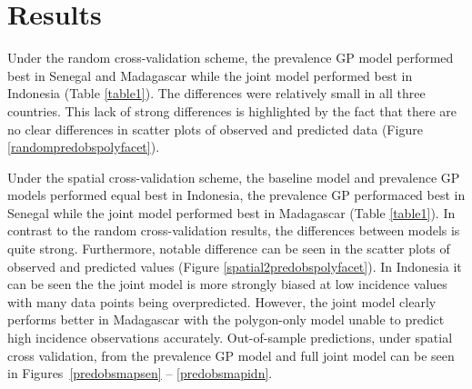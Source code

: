 \documentclass{statsoc}
\begin{document}
\begin{table}
\caption{\label{table1}
Summary of out-of-sample accuracy for all three cross-validation experiments. 
Mean absolute error of predicted incidence rate against out-of-sample observed data for three countries.}
\centering
{}
\end{table}



\section*{Results}


Under the random cross-validation scheme, the prevalence GP model performed best in Senegal and Madagascar while the joint model performed best in Indonesia (Table \ref{table1}).
The differences were relatively small in all three countries.
This lack of strong differences is highlighted by the fact that there are no clear differences in scatter plots of observed and predicted data (Figure \ref{randompredobspolyfacet}).




Under the spatial cross-validation scheme, the baseline model and prevalence GP models performed equal best in Indonesia, the prevalence GP performaced best in Senegal while the joint model performed best in Madagascar (Table \ref{table1}).
In contrast to the random cross-validation results, the differences between models is quite strong.
Furthermore, notable difference can be seen in the scatter plots of observed and predicted values (Figure \ref{spatial2predobspolyfacet}).
In Indonesia it can be seen the the joint model is more strongly biased at low incidence values with many data points being overpredicted.
However, the joint model clearly performs better in Madagascar with the polygon-only model unable to predict high incidence observations accurately.
Out-of-sample predictions, under spatial cross validation, from the prevalence GP model and full joint model can be seen in Figures~\ref{predobsmapsen} -- \ref{predobsmapidn}.
\end{document}
